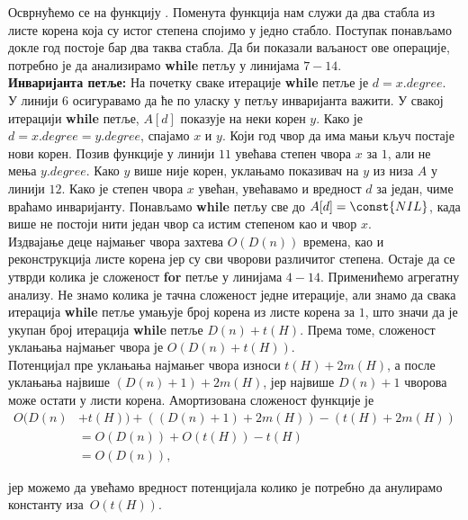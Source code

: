 \documentclass[11pt, a4paper]{article}
\theoremstyle{remark}
\numberwithin{equation}{section}
\begin{document}
	\noindent Осврнућемо се на функцију . Поменута функција нам служи да два стабла из листе корена која су истог степена спојимо у једно стабло. Поступак понављамо докле год постоје бар два таква стабла. Да би показали ваљаност ове операције, потребно је да анализирамо \textbf{while} петљу у линијама $7-14$. \\
	
	\indent \textbf{Инваријанта петље: } На почетку сваке итерације \textbf{while} петље је $d=x.degree$. \\
	
	\noindent У линији $6$ осигуравамо да ће по уласку у петљу инваријанта важити. У свакој итерацији \textbf{while} петље, $A[d]$ показује на неки корен $y$. Како је $d=x.degree=y.degree$, спајамо $x$ и $y$. Који год чвор да има мањи кључ постаје нови корен. Позив функције  у линији $11$ увећава степен чвора $x$ за $1$, али не мења $y.degree$. Како $y$ више није корен, уклањамо показивач на $y$ из низа $A$ у линији $12$. Како је степен чвора $x$ увећан, увећавамо и вредност $d$ за један, чиме враћамо инваријанту. Понављамо \textbf{while} петљу све до $A[d]=\const{NIL}$, када више не постоји нити један чвор са истим степеном као и чвор $x$. \\
	
	\noindent Издвајање деце најмањег чвора захтева $O(D(n))$ времена, као и реконструкција листе корена јер су сви чворови различитог степена. Остаје да се утврди колика је сложеност \textbf{for} петље у линијама $4-14$. Применићемо агрегатну анализу. Не знамо колика је тачна сложеност једне итерације, али знамо да свака итерација \textbf{while} петље умањује број корена из листе корена за $1$, што значи да је укупан број итерација \textbf{while} петље $D(n)+t(H)$. Према томе, сложеност уклањања најмањег чвора је $O(D(n)+t(H))$. \\
	\indent Потенцијал пре уклањања најмањег чвора износи $t(H)+2m(H)$, а после уклањања највише $(D(n)+1)+2m(H)$, јер највише $D(n)+1$ чворова може остати у листи корена. Амортизована сложеност функције  је	
	\begin{equation}
		\begin{split}
		O(D(n) &+ t(H))+((D(n)+1)+2m(H))-(t(H)+2m(H)) \\
		&= O(D(n))+O(t(H))-t(H) \\
		&= O(D(n)),
		\end{split}
	\end{equation}
	
	\noindent јер можемо да увећамо вредност потенцијала колико је потребно да анулирамо константу \mbox{иза $O(t(H))$.}
	
\end{document}
